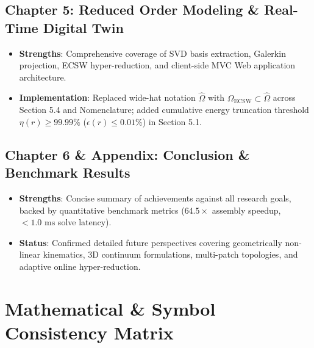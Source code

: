 \documentclass[11pt,a4paper]{article}
\begin{document}
\subsection*{Chapter 5: Reduced Order Modeling \& Real-Time Digital Twin}
\begin{itemize}
    \item \textbf{Strengths}: Comprehensive coverage of SVD basis extraction, Galerkin projection, ECSW hyper-reduction, and client-side MVC Web application architecture.
    \item \textbf{Implementation}: Replaced wide-hat notation $\widehat{\Omega}$ with $\Omega_{\text{ECSW}} \subset \hat{\Omega}$ across Section 5.4 and Nomenclature; added cumulative energy truncation threshold $\eta(r) \ge 99.99\%$ ($\epsilon(r) \le 0.01\%$) in Section 5.1.
\end{itemize}

\subsection*{Chapter 6 \& Appendix: Conclusion \& Benchmark Results}
\begin{itemize}
    \item \textbf{Strengths}: Concise summary of achievements against all research goals, backed by quantitative benchmark metrics ($64.5\times$ assembly speedup, $<1.0\text{ ms}$ solve latency).
    \item \textbf{Status}: Confirmed detailed future perspectives covering geometrically non-linear kinematics, 3D continuum formulations, multi-patch topologies, and adaptive online hyper-reduction.
\end{itemize}

\newpage
\section{Mathematical \& Symbol Consistency Matrix}
\end{document}
